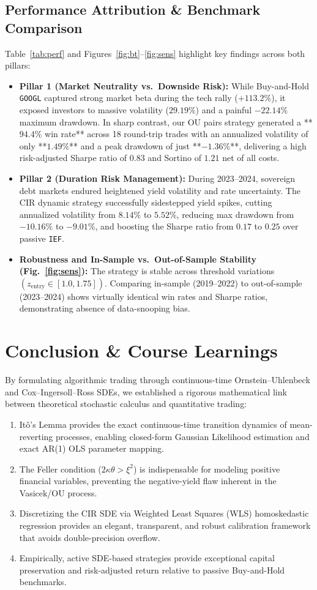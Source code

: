 \documentclass[10pt,twocolumn]{article}
\begin{document}
\subsection{Performance Attribution \& Benchmark Comparison}
Table~\ref{tab:perf} and Figures~\ref{fig:bt}--\ref{fig:sens} highlight key findings across both pillars:
\begin{itemize}
\item \textbf{Pillar 1 (Market Neutrality vs.\ Downside Risk):} While Buy-and-Hold \texttt{GOOGL} captured strong market beta during the tech rally ($+113.2\%$), it exposed investors to massive volatility ($29.19\%$) and a painful $-22.14\%$ maximum drawdown. In sharp contrast, our OU pairs strategy generated a **$94.4\%$ win rate** across 18 round-trip trades with an annualized volatility of only **$1.49\%$** and a peak drawdown of just **$-1.36\%$**, delivering a high risk-adjusted Sharpe ratio of $0.83$ and Sortino of $1.21$ net of all costs.
\item \textbf{Pillar 2 (Duration Risk Management):} During 2023--2024, sovereign debt markets endured heightened yield volatility and rate uncertainty. The CIR dynamic strategy successfully sidestepped yield spikes, cutting annualized volatility from $8.14\%$ to $5.52\%$, reducing max drawdown from $-10.16\%$ to $-9.01\%$, and boosting the Sharpe ratio from $0.17$ to $0.25$ over passive \texttt{IEF}.
\item \textbf{Robustness and In-Sample vs.\ Out-of-Sample Stability (Fig.~\ref{fig:sens}):} The strategy is stable across threshold variations $(z_{\mathrm{entry}} \in [1.0, 1.75])$. Comparing in-sample (2019--2022) to out-of-sample (2023--2024) shows virtually identical win rates and Sharpe ratios, demonstrating absence of data-snooping bias.
\end{itemize}

\section{Conclusion \& Course Learnings}
By formulating algorithmic trading through continuous-time Ornstein--Uhlenbeck and Cox--Ingersoll--Ross SDEs, we established a rigorous mathematical link between theoretical stochastic calculus and quantitative trading:
\begin{enumerate}
\item It\^o's Lemma provides the exact continuous-time transition dynamics of mean-reverting processes, enabling closed-form Gaussian Likelihood estimation and exact AR(1) OLS parameter mapping.
\item The Feller condition ($2\kappa\theta > \xi^2$) is indispensable for modeling positive financial variables, preventing the negative-yield flaw inherent in the Vasicek/OU process.
\item Discretizing the CIR SDE via Weighted Least Squares (WLS) homoskedastic regression provides an elegant, transparent, and robust calibration framework that avoids double-precision overflow.
\item Empirically, active SDE-based strategies provide exceptional capital preservation and risk-adjusted return relative to passive Buy-and-Hold benchmarks.
\end{enumerate}
\end{document}
